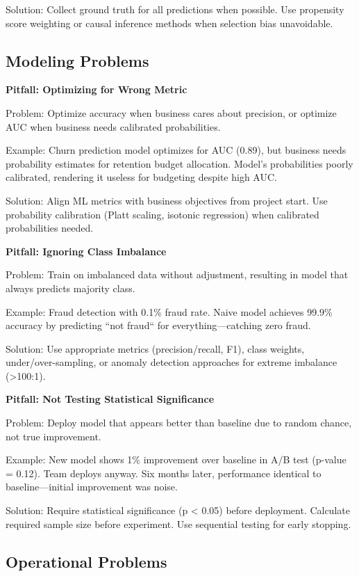 Solution: Collect ground truth for all predictions when possible. Use propensity score weighting or causal inference methods when selection bias unavoidable.

\subsection{Modeling Problems}

\textbf{Pitfall: Optimizing for Wrong Metric}

Problem: Optimize accuracy when business cares about precision, or optimize AUC when business needs calibrated probabilities.

Example: Churn prediction model optimizes for AUC (0.89), but business needs probability estimates for retention budget allocation. Model's probabilities poorly calibrated, rendering it useless for budgeting despite high AUC.

Solution: Align ML metrics with business objectives from project start. Use probability calibration (Platt scaling, isotonic regression) when calibrated probabilities needed.

\textbf{Pitfall: Ignoring Class Imbalance}

Problem: Train on imbalanced data without adjustment, resulting in model that always predicts majority class.

Example: Fraud detection with 0.1\% fraud rate. Naive model achieves 99.9\% accuracy by predicting ``not fraud`` for everything---catching zero fraud.

Solution: Use appropriate metrics (precision/recall, F1), class weights, under/over-sampling, or anomaly detection approaches for extreme imbalance (>100:1).

\textbf{Pitfall: Not Testing Statistical Significance}

Problem: Deploy model that appears better than baseline due to random chance, not true improvement.

Example: New model shows 1\% improvement over baseline in A/B test (p-value = 0.12). Team deploys anyway. Six months later, performance identical to baseline---initial improvement was noise.

Solution: Require statistical significance (p < 0.05) before deployment. Calculate required sample size before experiment. Use sequential testing for early stopping.

\subsection{Operational Problems}

